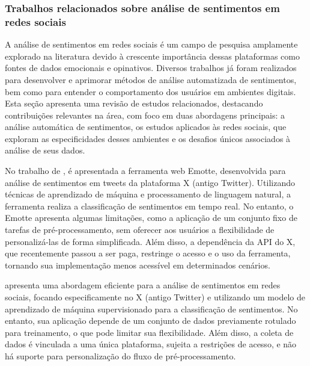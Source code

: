 \documentclass[
	12pt,				%
	oneside,			%
	a4paper,			%
	english,			%
	french,				%
	spanish,			%
	brazil				%
	]{abntex2}
\begin{document}
\hypertarget{trabalhos-relacionados-sobre-anuxe1lise-de-sentimentos-em-redes-sociais}{%
\subsubsection{Trabalhos relacionados sobre análise de sentimentos em
redes
sociais}\label{trabalhos-relacionados-sobre-anuxe1lise-de-sentimentos-em-redes-sociais}}

A análise de sentimentos em redes sociais é um campo de pesquisa
amplamente explorado na literatura devido à crescente importância dessas
plataformas como fontes de dados emocionais e opinativos. Diversos
trabalhos já foram realizados para desenvolver e aprimorar métodos de
análise automatizada de sentimentos, bem como para entender o
comportamento dos usuários em ambientes digitais. Esta seção apresenta
uma revisão de estudos relacionados, destacando contribuições relevantes
na área, com foco em duas abordagens principais: a análise automática de
sentimentos, os estudos aplicados às redes sociais, que exploram as
especificidades desses ambientes e os desafios únicos associados à
análise de seus dados.

No trabalho de , é apresentada a
ferramenta web Emotte, desenvolvida para análise de sentimentos em
tweets da plataforma X (antigo Twitter). Utilizando técnicas de
aprendizado de máquina e processamento de linguagem natural, a
ferramenta realiza a classificação de sentimentos em tempo real. No
entanto, o Emotte apresenta algumas limitações, como a aplicação de um
conjunto fixo de tarefas de pré-processamento, sem oferecer aos usuários
a flexibilidade de personalizá-las de forma simplificada. Além disso, a
dependência da API do X, que recentemente passou a ser paga, restringe o
acesso e o uso da ferramenta, tornando sua implementação menos acessível
em determinados cenários.

 apresenta uma abordagem eficiente
para a análise de sentimentos em redes sociais, focando especificamente
no X (antigo Twitter) e utilizando um modelo de aprendizado de máquina
supervisionado para a classificação de sentimentos. No entanto, sua
aplicação depende de um conjunto de dados previamente rotulado para
treinamento, o que pode limitar sua flexibilidade. Além disso, a coleta
de dados é vinculada a uma única plataforma, sujeita a restrições de
acesso, e não há suporte para personalização do fluxo de
pré-processamento.
\end{document}
